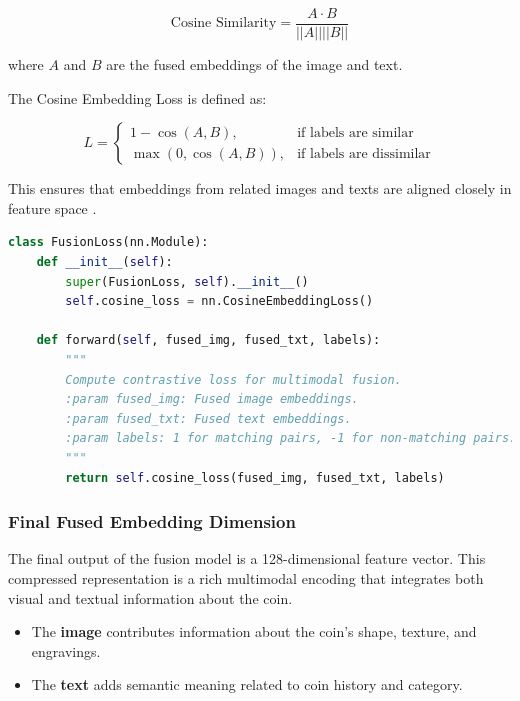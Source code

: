 \documentclass[nolibertine, english, algorithm, nomencl, minted]{ttlab-qualify}
\begin{document}
\[
\text{Cosine Similarity} = \frac{A \cdot B}{||A|| ||B||}
\]

where \( A \) and \( B \) are the fused embeddings of the image and text.

The Cosine Embedding Loss is defined as:

\[
L = \begin{cases}
1 - \cos(A, B), & \text{if labels are similar} \\
\max(0, \cos(A, B)), & \text{if labels are dissimilar}
\end{cases}
\]

This ensures that embeddings from related images and texts are aligned closely in feature space \parencite{hadsell2006dimensionality}.

\begin{footnotesize}
\begin{center}
\begin{tcolorbox}[colback=gray!10, colframe=black, arc=5mm]
\begin{lstlisting}[language=Python, breaklines=true]
class FusionLoss(nn.Module):
    def __init__(self):
        super(FusionLoss, self).__init__()
        self.cosine_loss = nn.CosineEmbeddingLoss()

    def forward(self, fused_img, fused_txt, labels):
        """
        Compute contrastive loss for multimodal fusion.
        :param fused_img: Fused image embeddings.
        :param fused_txt: Fused text embeddings.
        :param labels: 1 for matching pairs, -1 for non-matching pairs.
        """
        return self.cosine_loss(fused_img, fused_txt, labels)
\end{lstlisting}
\end{tcolorbox}
\end{center}
\end{footnotesize}

\subsubsection{Final Fused Embedding Dimension}

The final output of the fusion model is a 128-dimensional feature vector. 
This compressed representation is a rich multimodal encoding that integrates both visual and textual information about the coin.

\begin{itemize}
    \item The \textbf{image} contributes information about the coin’s shape, texture, and engravings.
    \item The \textbf{text} adds semantic meaning related to coin history and category.
\end{itemize}
\end{document}
